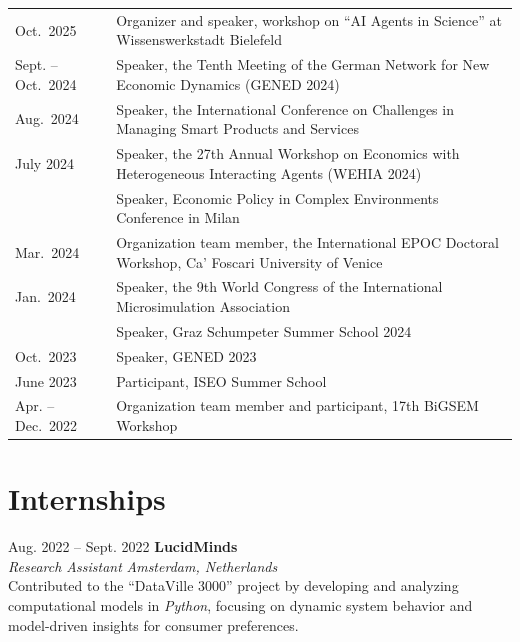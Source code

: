 \documentclass[a4paper,12pt]{article}
\makeatletter
\newenvironment{jobshort}[2]
    {
    \begin{tabularx}{\linewidth}{@{}l X r@{}}
    \textbf{#1} & \hfill &  #2 \\[3.75pt]
    \end{tabularx}
    }
    {
    }
\makeatother
\begin{document}

\begin{tabularx}{\linewidth}{@{}l X@{}}

Oct.\ 2025 & Organizer and speaker, workshop on “AI Agents in Science” at Wissenswerkstadt Bielefeld \\

Sept. -- Oct.\ 2024 & Speaker, the Tenth Meeting of the German Network for New Economic Dynamics (GENED 2024) \\

Aug.\ 2024 & Speaker, the International Conference on Challenges in Managing Smart Products and Services \\

July 2024 & Speaker, the 27th Annual Workshop on Economics with Heterogeneous Interacting Agents (WEHIA 2024) \\
& Speaker, Economic Policy in Complex Environments Conference in Milan \\

Mar.\ 2024 & Organization team member, the International EPOC Doctoral Workshop, Ca’ Foscari University of Venice \\

Jan.\ 2024 & Speaker, the 9th World Congress of the International Microsimulation Association \\

 & Speaker, Graz Schumpeter Summer School 2024 \\

Oct.\ 2023 & Speaker, GENED 2023 \\

June 2023 & Participant, ISEO Summer School \\

Apr. -- Dec.\ 2022 & Organization team member and participant, 17th BiGSEM Workshop \\

\end{tabularx}


\section{Internships}

Aug. 2022 -- Sept. 2022 \hfill \textbf{LucidMinds} \\ %
\textit{Research Assistant} \hfill \textit{Amsterdam, Netherlands} \\
\textbullet Contributed to the “DataVille 3000” project by developing and analyzing computational models in \textit{Python}, focusing on dynamic system behavior and model-driven insights for consumer preferences.
\end{document}
